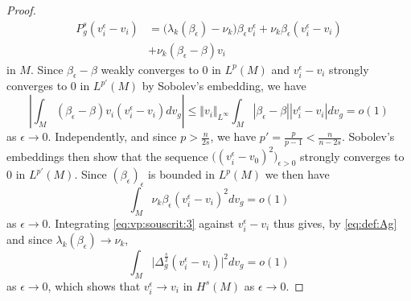 \documentclass[10pt]{amsart}
\numberwithin{equation}{section}
\def\ep{{\varepsilon}}
\def \ep{\epsilon}
\theoremstyle{plain}
\theoremstyle{remark}
\begin{document}
\begin{proof}
  \begin{equation} \label{eq:vp:souscrit:3} \begin{aligned}
 P_g^s(v_i^{\epsilon} - v_i) & = \big(\lambda_k (\beta_\epsilon) -\nu_k \big) \beta_\epsilon v_i^{\epsilon} + \nu_k \beta_\epsilon (v_i^{\epsilon} - v_i) \\
 & + \nu_k  (\beta_\epsilon - \beta) v_i
 \end{aligned} 
 \end{equation}
 in $M$. Since $\beta_{\epsilon} - \beta$ weakly converges  to $0$ in $L^p(M)$ and $v_i^{\epsilon} - v_i$ strongly converges  to $0$ in $L^{p'}(M)$ by Sobolev's embedding, we have 
$$ \left| \int_M  (\beta_\epsilon - \beta) v_i (v_i^{\epsilon} - v_i) dv_g \right| \le \Vert v_i \Vert_{L^\infty} \int_M |\beta_\epsilon - \beta| |v_i^{\epsilon} - v_i| dv_g = o(1) $$
as $\epsilon \to 0$. Independently, and since $p > \frac{n}{2s}$, we have $p' = \frac{p}{p-1} < \frac{n}{n-2s}$.  Sobolev's embeddings then show that the sequence  $\big( (v_i^{\ep} - v_0)^2 \big)_{\ep >0}$ strongly converges to $0$ in $L^{p'}(M)$. Since $(\beta_\ep)_{\ep}$ is bounded in $L^{p}(M)$ we then have
$$ \int_M  \nu_k \beta_\epsilon (v_i^{\epsilon} - v_i)^2 dv_g = o(1)$$
as $\ep \to 0$. Integrating \eqref{eq:vp:souscrit:3} against $v_i^{\epsilon} - v_i$ thus gives, by \eqref{eq:def:Ag} and since $\lambda_k (\beta_\epsilon) \to \nu_k$, 
$$ \int_M  \big|\Delta_g^{\frac{s}{2}} (v_i^{\epsilon} - v_i) \big|^2 dv_g  = o(1) $$
as $\epsilon \to 0$, which shows that $v_i^{\ep} \to v_i$ in $H^s(M)$ as $\ep \to 0$. 

\medskip


\end{proof}
\end{document}
